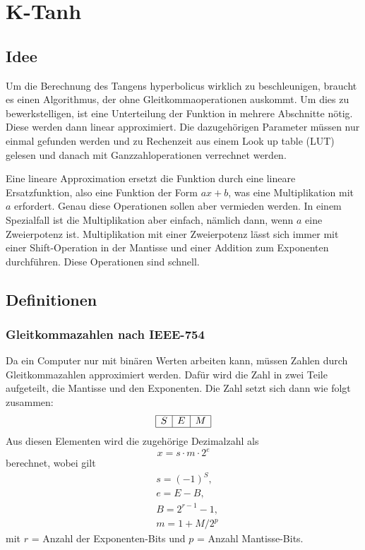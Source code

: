 %
%
%
\section{K-Tanh
\label{transfer:section:teil4}}

\subsection{Idee
	\label{transfer:subsection:Ktanh-Idee}}
Um die Berechnung des Tangens hyperbolicus wirklich zu beschleunigen,
braucht es einen Algorithmus, der ohne Gleitkommaoperationen auskommt.
Um dies zu bewerkstelligen, ist eine Unterteilung der Funktion in
mehrere Abschnitte nötig. Diese werden dann linear approximiert.
Die dazugehörigen Parameter müssen nur einmal gefunden werden und
zu Rechenzeit aus einem Look up table (LUT) gelesen und danach mit
Ganzzahloperationen verrechnet werden.

Eine lineare Approximation ersetzt die Funktion durch eine lineare
Ersatzfunktion, also eine Funktion der Form $ax+b$, was eine
Multiplikation mit $a$ erfordert.
Genau diese Operationen sollen aber vermieden werden.
In einem Spezialfall ist die Multiplikation aber einfach, nämlich
dann, wenn $a$ eine Zweierpotenz ist. 
Multiplikation mit einer Zweierpotenz lässt sich immer mit
einer Shift-Operation in der Mantisse und einer Addition zum
Exponenten durchführen.
Diese Operationen sind schnell.


\subsection{Definitionen
	\label{transfer:subsection:Ktanh-Definition}}

\subsubsection{Gleitkommazahlen nach IEEE-754
	\label{transfer:subsection:Ktanh-Algorithmus:Gleitkommazahl}}
Da ein Computer nur mit binären Werten arbeiten kann,
müssen Zahlen durch Gleitkommazahlen approximiert werden.
Dafür wird die Zahl in zwei Teile aufgeteilt, die Mantisse und den Exponenten.
Die Zahl setzt sich dann wie folgt zusammen:
\[
\begin{array}{|l|l|l|}
	\hline S & E & M \\
	\hline
\end{array}
\]
Aus diesen Elementen wird die zugehörige Dezimalzahl als
\[
x=s \cdot m \cdot 2^{e}
\]
berechnet,
wobei gilt
\[
\begin{aligned}
	&s=(-1)^{S}, \\
	&e=E-B,\\
	&B=2^{r-1}-1,\\
	&m=1+M / 2^{p}
\end{aligned}
\]
mit $r$ = Anzahl der Exponenten-Bits und $p$ = Anzahl Mantisse-Bits.

